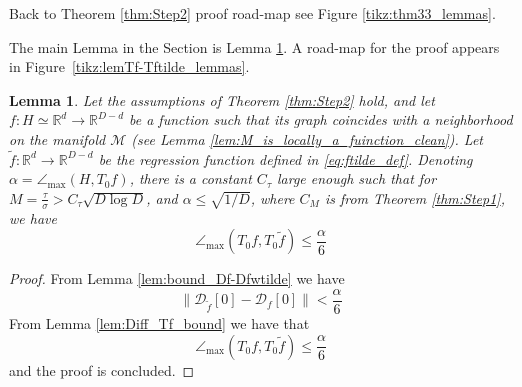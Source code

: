\documentclass[12pt]{article}
\newtheorem{Lemma}[Theorem]{Lemma}
\theoremstyle{remark}
\newcommand{\RR}{\mathbb{R}}
\newcommand{\MM}{\mathcal{M}}
\newcommand{\DD}{\mathcal{D}}
\newcommand{\wtilde}[1]{\widetilde{#1}}
\newcommand{\maxangle}{\angle_{\max}}
\newcommand{\stau}{\tau}
\newcommand{\sM}{{M}}
\begin{document}
\begin{appendices}
Back to Theorem \ref{thm:Step2} proof road-map see Figure \ref{tikz:thm33_lemmas}.


The main Lemma in the Section is Lemma \ref{lem:Tf_TtildeF_D}. A road-map for the proof appears in Figure~\ref{tikz:lemTf-Tftilde_lemmas}.

\begin{Lemma}\label{lem:Tf_TtildeF_D}
    Let the assumptions of Theorem \ref{thm:Step2} hold, and let $ f:H\simeq\RR^d\to\RR^{D-d} $ be a function such that its graph coincides with a neighborhood on the manifold $\MM$ (see Lemma \ref{lem:M_is_locally_a_fuinction_clean}). Let $\wtilde f:\RR^d\to\RR^{D-d} $ be the regression function defined in \eqref{eq:ftilde_def}. Denoting $\alpha = \maxangle(H, T_0 f)$, there is a constant $C_\stau$ large enough such that for $M = \frac{\tau}{\sigma}>C_\stau\sqrt{D \log D}$, and $\alpha \leq \sqrt{1/D}$, where $C_\sM$ is from Theorem \ref{thm:Step1}, we have 
    \[
	\maxangle(T_0 f, T_0 {\wtilde{f}}) 
	\leq  
	 \frac{\alpha}{6} 
	\]
\end{Lemma}
\begin{proof}
From Lemma \ref{lem:bound_Df-Dfwtilde} we have 
\[
\|\DD_{\wtilde{f}}[0] - \DD_f[0]\| < \frac{\alpha}{6}
\]
From Lemma \ref{lem:Diff_Tf_bound} we have that 
    \[
	\maxangle(T_0 f, T_0 {\wtilde{f}}) 
	\leq   \frac{\alpha}{6}
	\]
	and the proof is concluded. 
\end{proof}



\end{appendices}
\end{document}
